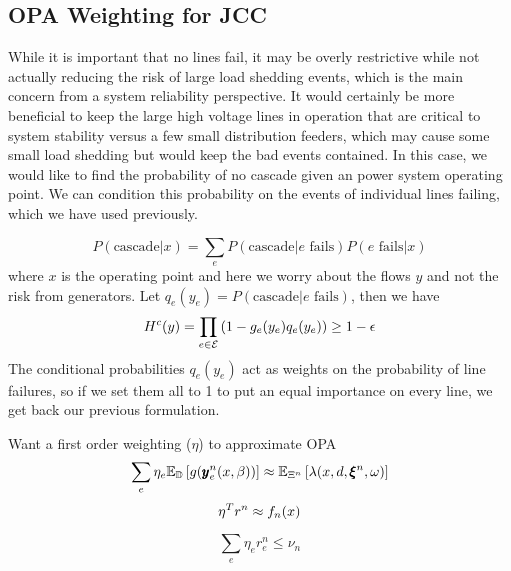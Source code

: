 \subsection{OPA Weighting for JCC}


While it is important that no lines fail, it may be overly restrictive while not actually reducing the risk of large load shedding events, which is the main concern from a system reliability perspective. It would certainly be more beneficial to keep the large high voltage lines in operation that are critical to system stability versus a few small distribution feeders, which may cause some small load shedding but would keep the bad events contained.  In this case, we would like to find the probability of no cascade given an power system operating point.  We can condition this probability on the events of individual lines failing, which we have used previously.


\begin{equation*}
P(\mbox{cascade}|x) = \sum_e P(\mbox{cascade}|e\mbox{ fails}) P(e\mbox{ fails}|x)
\end{equation*}
where $x$ is the operating point and here we worry about the flows $y$ and not the risk from generators.  Let $q_e(y_e) = P(\mbox{cascade}|e\mbox{ fails})$, then we have
\begin{equation} 
H^c(y) = \prod_{e \in \mathcal{E}} \left( 1 - g_e(y_e)q_e(y_e) \right) \geq 1 - \epsilon
  \end{equation}  
The conditional probabilities $q_e(y_e)$ act as weights on the probability of line failures, so if we set them all to 1 to put an equal importance on every line, we get back our previous formulation.





Want a first order weighting ($\eta$) to approximate OPA
\begin{equation*} 
\sum_e \eta_e \mathbb{E}_{\mathbb{D}} \left[ g(\pmb{y}_e^n(x,\beta)) \right] \approx \mathbb{E}_{\Xi^n} \left[ \lambda ( x,d,\pmb{\xi}^n,\omega)  \right]
\end{equation*}
\begin{equation*}
\eta^T r^n \approx f_n(x)
\end{equation*}

\begin{equation}\label{jcc_ow_weight}
\sum_e \eta_e r^n_e  \leq \nu_n
\end{equation}

